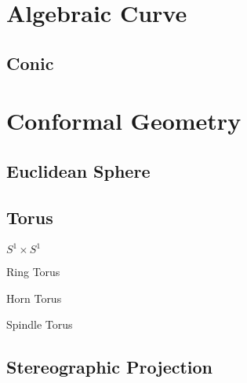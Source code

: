 \section{Algebraic Curve}\label{sec:algebraic_curve}

\subsection{Conic}\label{sec:conic}



\section{Conformal Geometry}\label{sec:conformal_geometry}

\subsection{Euclidean Sphere}\label{sec:euclidean_sphere}

\subsection{Torus}\label{sec:torus}

$S^1 \times S^1$

Ring Torus

Horn Torus

Spindle Torus



\subsection{Stereographic Projection}\label{sec:stereographic_projection}

